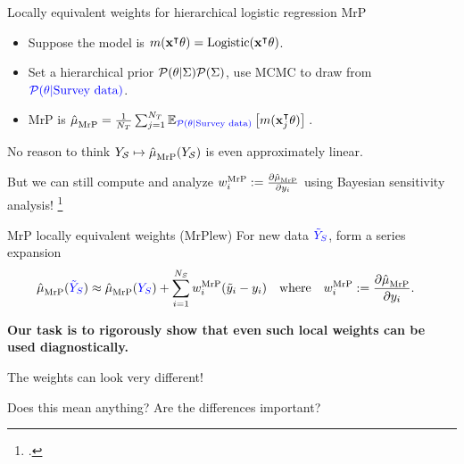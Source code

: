 \begin{frame}[t]{Locally equivalent weights for hierarchical logistic regression MrP}

\def\Y{\surcol{Y_S}}
\def\Ytil{\surcol{\tilde{Y}_S}}
%
\begin{itemize}
    \item Suppose the model is $m(\mathbf{x}^\intercal \theta) = \mathrm{Logistic}(\mathbf{x}^\intercal \theta)$.
    \item Set a hierarchical prior $\mathcal{P}(\theta \vert \Sigma)\mathcal{P}(\Sigma)$,
            use MCMC to draw from $\textcolor{blue}{\mathcal{P}(\theta \vert \textrm{Survey data})}$.
    \item MrP is $\hat{\mu}^{}_{\mathrm{MrP}} = \frac{1}{{N_T}} \sum_{j=1}^{N_T} \mathbb{E}_{\textcolor{blue}{\mathcal{P}(\theta \vert \textrm{Survey data})}}\left[ m(\mathbf{x}_j^\intercal \theta)\right]\,$.
\end{itemize}
%
No reason to think $Y_{\mathcal{S}} \mapsto \hat{\mu}^{}_{\mathrm{MrP}}(Y_{\mathcal{S}})$ is even approximately linear.

But we can still compute and analyze $w_i^{\mathrm{MrP}} := \frac{\partial \hat{\mu}^{}_{\mathrm{MrP}}}{\partial y_i}$
using Bayesian sensitivity analysis!
\footcite{gustafson:1996:localposterior,giordano:2018:covariances}

\pause
\begin{block}{MrP locally equivalent weights (MrPlew)}
\centering
\vspace{1em}
For new data $\Ytil$, form a series expansion
$$
\begin{aligned}
\muhat_\mrp(\Ytil) \approx{}& \muhat_\mrp(\Y) + \sumsur \w_i^\mrp (\ytil_i - \y_i)\quad
\textrm{where}\quad \w_i^\mrp :={} \frac{\partial \muhat_\mrp}{\partial \y_i}.
\end{aligned}
$$
\vspace{1em}
\end{block}
%
\pause
\textbf{
Our task is to rigorously show that even such local weights can be used
diagnostically.
}

%


\end{frame}




\begin{frame}{The weights can look very different!}

    \centering
    Does this mean anything?  Are the differences important?

    \AlexanderWeightPlot{}
\end{frame}


